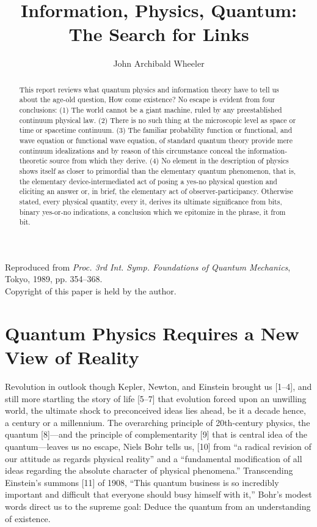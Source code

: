 \documentclass[11pt]{article}
\title{Information, Physics, Quantum: The Search for Links}
\author{John Archibald Wheeler}
\date{}
\begin{document}
	\maketitle
	
	\begin{center}
		\small Reproduced from \emph{Proc. 3rd Int. Symp. Foundations of Quantum Mechanics}, Tokyo, 1989, pp. 354--368.\\
		\small Copyright of this paper is held by the author.
	\end{center}
	
	\begin{abstract}
		This report reviews what quantum physics and information theory have to tell us
		about the age-old question, How come existence? No escape is evident from four
		conclusions: (1) The world cannot be a giant machine, ruled by any preestablished
		continuum physical law. (2) There is no such thing at the microscopic level as
		space or time or spacetime continuum. (3) The familiar probability function or
		functional, and wave equation or functional wave equation, of standard quantum
		theory provide mere continuum idealizations and by reason of this circumstance
		conceal the information-theoretic source from which they derive. (4) No element in
		the description of physics shows itself as closer to primordial than the elementary
		quantum phenomenon, that is, the elementary device-intermediated act of posing a
		yes-no physical question and eliciting an answer or, in brief, the elementary act of
		observer-participancy. Otherwise stated, every physical quantity, every it, derives
		its ultimate significance from bits, binary yes-or-no indications, a conclusion which
		we epitomize in the phrase, it from bit.
	\end{abstract}
	
	\section{Quantum Physics Requires a New View of Reality}
	Revolution in outlook though Kepler, Newton, and Einstein brought us [1--4], and
	still more startling the story of life [5--7] that evolution forced upon an unwilling
	world, the ultimate shock to preconceived ideas lies ahead, be it a decade hence,
	a century or a millennium. The overarching principle of 20th-century physics, the
	quantum [8]---and the principle of complementarity [9] that is central idea of the
	quantum---leaves us no escape, Niels Bohr tells us, [10] from ``a radical revision
	of our attitude as regards physical reality'' and a ``fundamental modification of
	all ideas regarding the absolute character of physical phenomena.'' Transcending
	Einstein's summons [11] of 1908, ``This quantum business is so incredibly important
	and difficult that everyone should busy himself with it,'' Bohr's modest words direct
	us to the supreme goal: Deduce the quantum from an understanding of existence.
	
\end{document}
